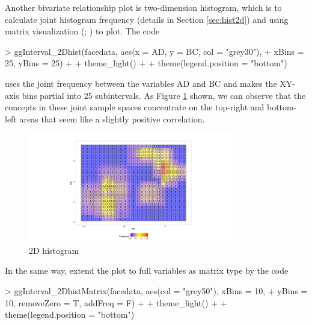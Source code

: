 \documentclass[article]{jss}
\begin{document}
Another bivariate relationship plot is two-dimension histogram, which is to calculate joint histogram frequency (details in Section \ref{sec:hist2d}) and using matrix visualization (\cite{chen2002generalized}; \cite{chen2004matrix}) to plot. The code

\begin{Schunk}
\begin{Sinput}
> ggInterval_2Dhist(facedata, aes(x = AD, y = BC, col = "grey30"),
+                   xBins = 25, yBins = 25) + 
+   theme_light() +
+   theme(legend.position = "bottom")
\end{Sinput}
\end{Schunk}

uses the joint frequency between the variables AD and BC and makes the XY-axis bins partial into 25 subintervals. As Figure \ref{fig:2Dhist} shown, we can observe that the concepts in these joint sample spaces concentrate on the top-right and bottom-left areas that seem like a slightly positive correlation.

\begin{figure}[htbp]
\centering
\includegraphics[trim=3cm 0.4cm 3cm 1.4cm,width=0.8\textwidth,clip]{ggESDA_Jiang&Wu_20210915-2Dhist.pdf
}
\caption{\label{fig:2Dhist} 2D histogram }
\end{figure}

In the same way, extend the plot to full variables as matrix type by the code

\begin{Schunk}
\begin{Sinput}
> ggInterval_2DhistMatrix(facedata, aes(col = "grey50"), xBins = 10,
+                         yBins = 10, removeZero = T, addFreq = F) +
+   theme_light() + 
+   theme(legend.position = "bottom")
\end{Sinput}
\end{Schunk}
\end{document}
